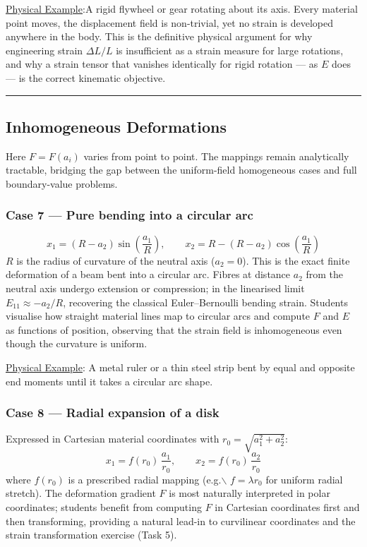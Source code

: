 \documentclass[11pt]{article}
\begin{document}
\uline{Physical Example}:A rigid flywheel or gear rotating about its axis. Every material point moves, the displacement field is non-trivial, yet no strain is developed anywhere in the body. This is the definitive physical argument for why engineering strain \(\Delta L/L\) is insufficient as a strain measure for large rotations, and why a strain tensor that vanishes identically for rigid rotation — as \(E\) does — is the correct kinematic objective.

\noindent\rule{\textwidth}{0.5pt}
\subsection*{Inhomogeneous Deformations}
\label{sec:orgda13fba}

Here \(F = F(a_i)\) varies from point to point.  The mappings remain
analytically tractable, bridging the gap between the uniform-field
homogeneous cases and full boundary-value problems.
\subsubsection*{Case 7 — Pure bending into a circular arc}
\label{sec:orgc032a24}
\[
  x_1 = (R - a_2)\sin\!\left(\frac{a_1}{R}\right), \qquad
  x_2 = R - (R - a_2)\cos\!\left(\frac{a_1}{R}\right)
\]
\(R\) is the radius of curvature of the neutral axis (\(a_2 = 0\)).  This
is the exact finite deformation of a beam bent into a circular arc.
Fibres at distance \(a_2\) from the neutral axis undergo extension or
compression; in the linearised limit \(E_{11} \approx -a_2/R\),
recovering the classical Euler--Bernoulli bending strain.  Students
visualise how straight material lines map to circular arcs and compute
\(F\) and \(E\) as functions of position, observing that the strain field
is inhomogeneous even though the curvature is uniform.

\uline{Physical Example}: A metal ruler or a thin steel strip bent by equal and opposite end moments until it takes a circular arc shape.
\subsubsection*{Case 8 — Radial expansion of a disk}
\label{sec:orgcb5b9fc}
Expressed in Cartesian material coordinates with \(r_0 = \sqrt{a_1^2 + a_2^2}\):
\[
  x_1 = f(r_0)\,\frac{a_1}{r_0}, \qquad
  x_2 = f(r_0)\,\frac{a_2}{r_0}
\]
where \(f(r_0)\) is a prescribed radial mapping (e.g.$\backslash$ \(f = \lambda r_0\)
for uniform radial stretch).  The deformation gradient \(F\) is most
naturally interpreted in polar coordinates; students benefit from
computing \(F\) in Cartesian coordinates first and then transforming,
providing a natural lead-in to curvilinear coordinates and the strain
transformation exercise (Task 5).
\end{document}
